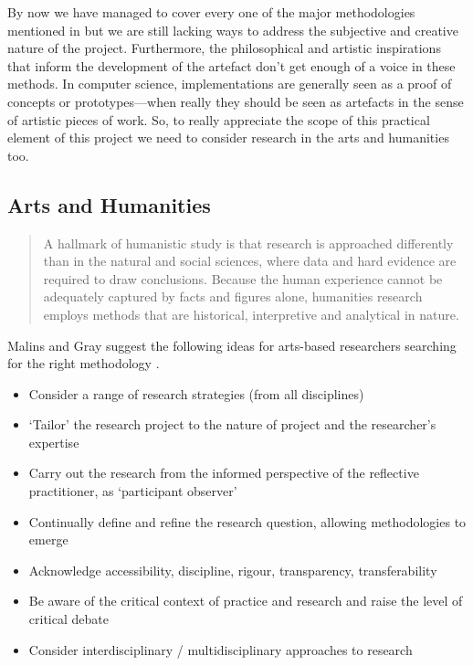 By now we have managed to cover every one of the major methodologies mentioned in \autocite{Amaral2006} but we are still lacking ways to address the subjective and creative nature of the project. Furthermore, the philosophical and artistic inspirations that inform the development of the artefact don't get enough of a voice in these methods. In computer science, implementations are generally seen as a proof of concepts or prototypes---when really they should be seen as artefacts in the sense of artistic pieces of work. So, to really appreciate the scope of this practical element of this project we need to consider research in the arts and humanities too.


\subsection{Arts and Humanities}


\begin{quotation}
  A hallmark of humanistic study is that research is approached differently than in the natural and social sciences, where data and hard evidence are required to draw conclusions. Because the human experience cannot be adequately captured by facts and figures alone, humanities research employs methods that are historical, interpretive and analytical in nature. 
\end{quotation}

Malins and Gray suggest the following ideas for arts-based researchers searching for the right methodology \citeyear{Malins1995}.

\begin{itemize}
  \item Consider a range of research strategies (from all disciplines)
  \item `Tailor' the research project to the nature of project and the researcher's expertise
  \item Carry out the research from the informed perspective of the reflective practitioner, as `participant observer'
  \item Continually define and refine the research question, allowing methodologies to emerge
  \item Acknowledge accessibility, discipline, rigour, transparency, transferability
  \item Be aware of the critical context of practice and research and raise the level of critical debate
  \item Consider interdisciplinary / multidisciplinary approaches to research
\end{itemize}

